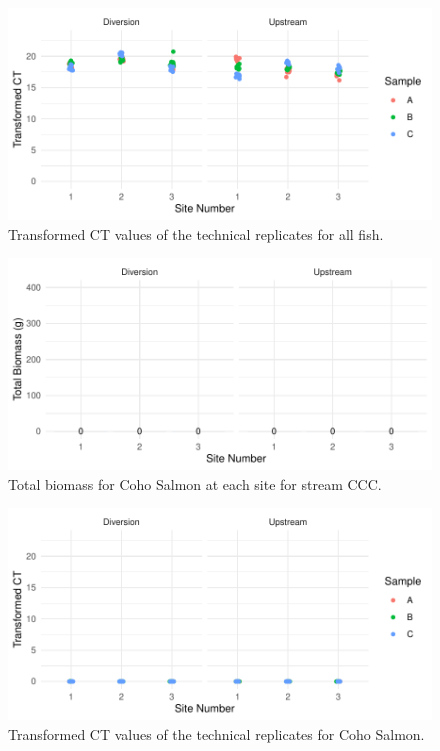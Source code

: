 \begin{figure}[H]
\centering
\includegraphics{Chapter5Images/CCC_ef_tct.pdf}
\caption{ \hspace{1mm} Transformed CT values of the technical replicates for all fish.}
\label{fig:CCC_ef}
\end{figure}



\begin{figure}[H]
\centering
\includegraphics{Chapter5Images/CCC_Co_new.pdf}
\caption{  \hspace{1mm}Total biomass for Coho Salmon at each site for stream CCC.}
\label{fig:testCCCbiomCo}
\end{figure}





\begin{figure}[H]
\centering
\includegraphics{Chapter5Images/CCC_co_tct.pdf}
\caption{  \hspace{1mm}Transformed CT values of the technical replicates for Coho Salmon.}
\label{fig:CCC_co}
\end{figure}


